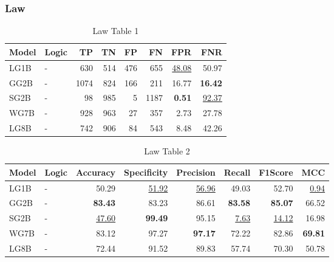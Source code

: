 \documentclass{article}
\begin{document}

\subsubsection{Law}

\begin{table}[H]
\centering
\begin{tabular}{llrrrrrr}
\toprule
 Model          & Logic   &   TP &   TN &   FP &   FN &   FPR &   FNR \\
\midrule

 LG1B    & -       &  630 &  514 &  476 &  655 & \underline{48.08} & 50.97             \\
 GG2B    & -       & 1074 &  824 &  166 &  211 & 16.77             & \textbf{16.42}    \\
 SG2B    & -       &   98 &  985 &    5 & 1187 & \textbf{0.51}     & \underline{92.37} \\
 WG7B    & -       &  928 &  963 &   27 &  357 & 2.73              & 27.78             \\
 LG8B    & -       &  742 &  906 &   84 &  543 & 8.48              & 42.26             \\

\bottomrule
\end{tabular}
\caption{\label{tab:widgets}Law Table 1}
\end{table}

\begin{table}[H]
\begin{tabular}{llrrrrrr}
\toprule
 Model          & Logic   &   Accuracy &   Specificity &   Precision &   Recall &   F1Score &      MCC \\
\midrule

 LG1B    & -       & 50.29             & \underline{51.92} & \underline{56.96} & 49.03            & 52.70             & \underline{0.94} \\
 GG2B    & -       & \textbf{83.43}    & 83.23             & 86.61             & \textbf{83.58}   & \textbf{85.07}    & 66.52            \\
 SG2B    & -       & \underline{47.60} & \textbf{99.49}    & 95.15             & \underline{7.63} & \underline{14.12} & 16.98            \\
 WG7B    & -       & 83.12             & 97.27             & \textbf{97.17}    & 72.22            & 82.86             & \textbf{69.81}   \\
 LG8B    & -       & 72.44             & 91.52             & 89.83             & 57.74            & 70.30             & 50.78            \\

\bottomrule
\end{tabular}
\caption{\label{tab:xstest2}Law Table 2}
\end{table}
\end{document}
